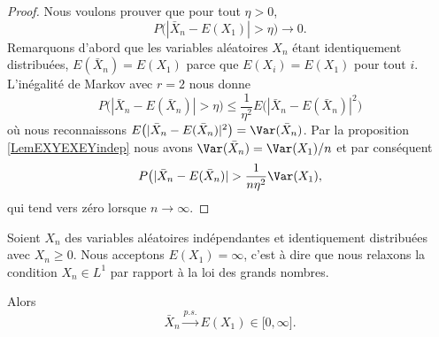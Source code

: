 \begin{proof}
    Nous voulons prouver que pour tout \( \eta>0\),
    \begin{equation}
        P\big( | \bar X_n-E(X_1) |>\eta \big)\to 0.
    \end{equation}
    Remarquons d'abord que les variables aléatoires \( X_n\) étant identiquement distribuées, \( E(\bar X_n)=E(X_1)\) parce que \( E(X_i)=E(X_1)\) pour tout \( i\). L'inégalité de Markov avec \( r=2\) nous donne
    \begin{equation}
        P\big( | \bar X_n-E(\bar X_n) |>\eta \big)\leq\frac{1}{ \eta^2 }E\big( | \bar X_n-E(\bar X_n) |^2 \big)
    \end{equation}
    où nous reconnaissons \( E\big( | \bar X_n-E(\bar X_n) |^2 \big)=\Var(\bar X_n)\). Par la proposition \ref{LemEXYEXEYindep} nous avons \( \Var(\bar X_n)=\Var(X_1)/n\) et par conséquent
    \begin{equation}
        P\big( | \bar X_n-E(\bar X_n) |>\frac{1}{ n\eta^2 }\Var(X_1),
    \end{equation}
    qui tend vers zéro lorsque \( n\to\infty\).
\end{proof}

\begin{proposition}
    Soient \( X_n\) des variables aléatoires indépendantes et identiquement distribuées avec \( X_n\geq 0\). Nous acceptons \( E(X_1)=\infty\), c'est à dire que nous relaxons la condition \( X_n\in L^1\) par rapport à la loi des grands nombres.

    Alors
    \begin{equation}
        \bar X_n\stackrel{p.s.}{\longrightarrow} E(X_1)\in\mathopen[ 0 , \infty \mathclose].
    \end{equation}
\end{proposition}

